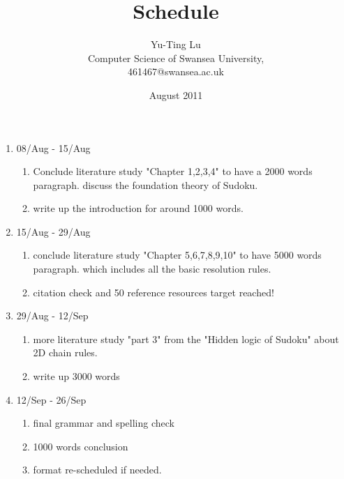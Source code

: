 \documentclass{article}
\begin{document}
\title{Schedule}
\author{Yu-Ting Lu\\
 Computer Science of Swansea University,\\
 461467@swansea.ac.uk}
\date{August 2011}
\maketitle

\begin{enumerate}
\item 08/Aug - 15/Aug
  \begin{enumerate}
  \item Conclude literature study "Chapter 1,2,3,4" to have a 2000 words paragraph. discuss the foundation theory of Sudoku.
  \item write up the introduction for around 1000 words.
  \end{enumerate}
\item 15/Aug - 29/Aug
  \begin{enumerate}
  \item conclude literature study "Chapter 5,6,7,8,9,10" to have 5000 words paragraph. which includes all the basic resolution rules.
  \item citation check and 50 reference resources target reached!
  \end{enumerate}
\item 29/Aug - 12/Sep
  \begin{enumerate}
  \item more literature study "part 3" from the "Hidden logic of Sudoku" about 2D chain rules.
  \item write up 3000 words
  \end{enumerate}
\item 12/Sep - 26/Sep
  \begin{enumerate}
  \item final grammar and spelling check
  \item 1000 words conclusion
  \item format re-scheduled if needed.
  \end{enumerate}
\end{enumerate}
\end{document}
